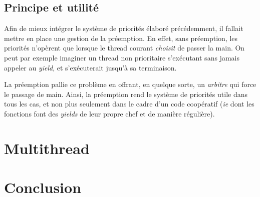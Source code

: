 \documentclass[a4paper,11pt]{article}
\begin{document}
\subsection{Principe et utilité}

Afin de mieux intégrer le système de priorités élaboré précédemment, il fallait mettre en place une gestion de la préemption. En effet, sans préemption, les priorités n'opèrent que lorsque le thread courant \textit{choisit} de passer la main. On peut par exemple imaginer un thread non prioritaire s'exécutant sans jamais appeler au \textit{yield}, et s'exécuterait jusqu'à sa terminaison.

La préemption pallie ce problème en offrant, en quelque sorte, un \textit{arbitre} qui force le passage de main. Ainsi, la préemption rend le système de priorités utile dans tous les cas, et non plus seulement dans le cadre d'un code coopératif (\textit{ie} dont les fonctions font des \textit{yields} de leur propre chef et de manière régulière).

\section{Multithread}


\section*{Conclusion} %
\end{document}
